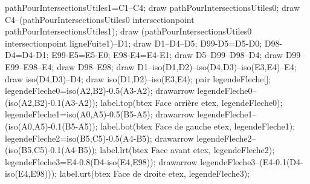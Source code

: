 \begin{exercice*}
{\begin{Geometrie}
        pathPourIntersectionsUtiles1=C1--C4;
        draw pathPourIntersectionsUtiles0;
        draw C4--(pathPourIntersectionsUtiles0 intersectionpoint pathPourIntersectionsUtiles1);
        draw (pathPourIntersectionsUtiles0 intersectionpoint ligneFuite1)--D1;
        draw D1--D4--D5;
        D99-D5=D5-D0;
        D98-D4=D4-D1;
        E99-E5=E5-E0;
        E98-E4=E4-E1;
        draw D5--D99--D98--D4;
        draw D99--E99--E98--E4;
        draw D98--E98;
        draw D1--iso(D1,D2)--iso(D4,D3)--iso(E3,E4)--E4;
        draw iso(D4,D3)--D4;
        draw iso(D1,D2)--iso(E3,E4);
        pair legendeFleche[];
        legendeFleche0=iso(A2,B2)-0.5(A3-A2);
        drawarrow legendeFleche0--(iso(A2,B2)-0.1(A3-A2));
        label.top(btex Face arrière etex, legendeFleche0);
        legendeFleche1=iso(A0,A5)-0.5(B5-A5);
        drawarrow legendeFleche1--(iso(A0,A5)-0.1(B5-A5));
        label.bot(btex Face de gauche etex, legendeFleche1);
        legendeFleche2=iso(B5,C5)-0.5(A4-B5);
        drawarrow legendeFleche2--(iso(B5,C5)-0.1(A4-B5));
        label.lrt(btex Face avant etex, legendeFleche2);
        legendeFleche3=E4-0.8(D4-iso(E4,E98));
        drawarrow legendeFleche3--(E4-0.1(D4-iso(E4,E98)));
        label.urt(btex Face de droite etex, legendeFleche3);
    \end{Geometrie}
    }
\end{exercice*}    
